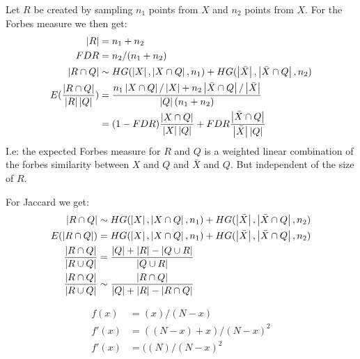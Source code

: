 

\newcommand{\forbes}[2]{\frac{\abs{#1 \cap #2}}{\abs{#1}\abs{#2}}}
\newcommand{\jaccard}[2]{\frac{\abs{#1 \cap #2}}{\abs{#1 \cup #2}}}

Let $R$ be created by sampling $n_1$ points from $X$ and $n_2$ points from $X$. For the Forbes measure we then get:
\begin{align*}
  \abs{R} &= n_1+n_2\\
  FDR &= n_2/(n_1+n_2)\\
  \abs{R \cap Q} &\sim HG(\abs{X}, \abs{X \cap Q}, n_1) + HG(\abs{\bar{X}}, \abs{\bar X \cap Q}, n_2)\\
  E(\forbes{R}{Q}) &= \frac{n_1\abs{X \cap Q}/\abs{X}+n_2\abs{\bar X \cap Q}/\abs{\bar{X}}}{\abs{Q}(n_1+n_2)}\\
          &= (1-FDR)\forbes{X}{Q} + FDR\forbes{\bar{X}}{Q}\\
\end{align*}
I.e:  the expected Forbes measure for $R$ and $Q$ is a weighted linear combination of the forbes similarity between $X$ and $Q$ and $\bar X$ and $Q$. But independent of the size of $R$.

For Jaccard we get:
\begin{align*}
  \abs{R \cap Q} &\sim HG(\abs{X}, \abs{X \cap Q}, n_1) + HG(\abs{\bar{X}}, \abs{\bar X \cap Q}, n_2)\\
  E(\abs{R \cap Q}) &=   HG(\abs{X}, \abs{X \cap Q}, n_1) + HG(\abs{\bar{X}}, \abs{\bar X \cap Q}, n_2)\\
  \jaccard{R}{Q} &= \frac{\abs Q + \abs R - \abs{Q \cup R}}{\abs{Q \cup R}}\\
  \jaccard{R}{Q} &\sim \frac{\abs{R \cap Q}}{\abs{Q}+\abs{R}-\abs{R \cap Q}}\\
\end{align*}

\begin{align*}
  f(x) &= (x)/(N-x)\\
  f'(x) &= ((N-x)+x)/(N-x)^2\\
  f'(x) &= ((N)/(N-x)^2\\
\end{align*}


